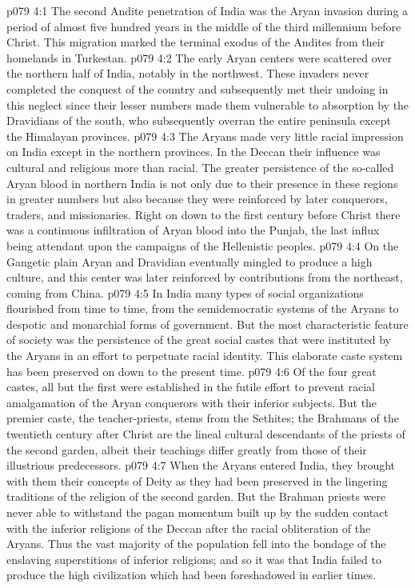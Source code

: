 \vs p079 4:1 The second Andite penetration of India was the Aryan invasion during a period of almost five hundred years in the middle of the third millennium before Christ. This migration marked the terminal exodus of the Andites from their homelands in Turkestan.
\vs p079 4:2 The early Aryan centers were scattered over the northern half of India, notably in the northwest. These invaders never completed the conquest of the country and subsequently met their undoing in this neglect since their lesser numbers made them vulnerable to absorption by the Dravidians of the south, who subsequently overran the entire peninsula except the Himalayan provinces.
\vs p079 4:3 The Aryans made very little racial impression on India except in the northern provinces. In the Deccan their influence was cultural and religious more than racial. The greater persistence of the so\hyp{}called Aryan blood in northern India is not only due to their presence in these regions in greater numbers but also because they were reinforced by later conquerors, traders, and missionaries. Right on down to the first century before Christ there was a continuous infiltration of Aryan blood into the Punjab, the last influx being attendant upon the campaigns of the Hellenistic peoples.
\vs p079 4:4 On the Gangetic plain Aryan and Dravidian eventually mingled to produce a high culture, and this center was later reinforced by contributions from the northeast, coming from China.
\vs p079 4:5 In India many types of social organizations flourished from time to time, from the semidemocratic systems of the Aryans to despotic and monarchial forms of government. But the most characteristic feature of society was the persistence of the great social castes that were instituted by the Aryans in an effort to perpetuate racial identity. This elaborate caste system has been preserved on down to the present time.
\vs p079 4:6 Of the four great castes, all but the first were established in the futile effort to prevent racial amalgamation of the Aryan conquerors with their inferior subjects. But the premier caste, the teacher\hyp{}priests, stems from the Sethites; the Brahmans of the twentieth century after Christ are the lineal cultural descendants of the priests of the second garden, albeit their teachings differ greatly from those of their illustrious predecessors.
\vs p079 4:7 When the Aryans entered India, they brought with them their concepts of Deity as they had been preserved in the lingering traditions of the religion of the second garden. But the Brahman priests were never able to withstand the pagan momentum built up by the sudden contact with the inferior religions of the Deccan after the racial obliteration of the Aryans. Thus the vast majority of the population fell into the bondage of the enslaving superstitions of inferior religions; and so it was that India failed to produce the high civilization which had been foreshadowed in earlier times.

